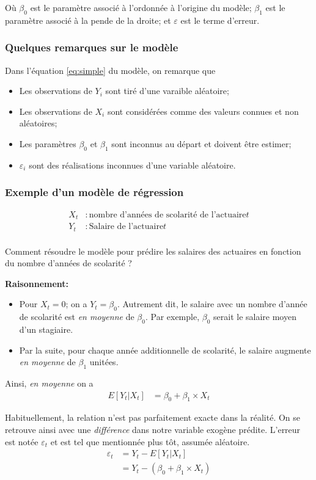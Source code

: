 \documentclass[11pt,french]{report}
\begin{document}
Où $\beta_0$ est le paramètre associé à l'ordonnée à l'origine du modèle;
$\beta_1$ est le paramètre associé à la pende de la droite;
et $\varepsilon$ est le terme d'erreur.

\subsubsection*{Quelques remarques sur le modèle}
Dans l'équation \ref{eq:simple} du modèle, on remarque que 
\begin{itemize}
\item Les observations de $Y_i$ sont tiré d'une varaible aléatoire;
\item Les observations de $X_i$ sont considérées comme des valeurs connues et non aléatoires;
\item Les paramètres $\beta_0$ et $\beta_1$ sont inconnus au départ et doivent être estimer;
\item $\varepsilon_i$ sont des réalisations inconnues d'une variable aléatoire.
\end{itemize}

\subsubsection*{Exemple d'un modèle de régression}
\begin{align*}
X_t &: \text{nombre d'années de scolarité de l'actuaire} t \\
Y_t &: \text{Salaire de l'actuaire} t\\
\end{align*}

Comment résoudre le modèle pour prédire les salaires des actuaires en fonction du nombre d'années de scolarité ?

\textbf{Raisonnement:}
\begin{itemize}
\item Pour $X_t = 0$; on a $Y_t = \beta_0$. Autrement dit, le salaire avec un nombre d'année de scolarité est \emph{en moyenne} de $\beta_0$. Par exemple, $\beta_0$ serait le salaire moyen d'un stagiaire.
\item Par la suite, pour chaque année additionnelle de scolarité, le salaire augmente \emph{en moyenne }de $\beta_1$ unitées.
\end{itemize}
Ainsi, \emph{en moyenne} on a 
\begin{align*}
E[Y_t|X_t] &= \beta_0 + \beta_1\times X_t
\end{align*}

Habituellement, la relation n'est pas parfaitement exacte dans la réalité. On se retrouve ainsi avec une \emph{différence} dans notre variable exogène prédite. L'erreur est notée $\varepsilon_t$ et est tel que mentionnée plus tôt, assumée aléatoire.
\begin{align*}
\varepsilon_t &= Y_t - E[Y_t|X_t] \\
&= Y_t - (\beta_0 + \beta_1\times X_t)\\
\end{align*}
\end{document}
